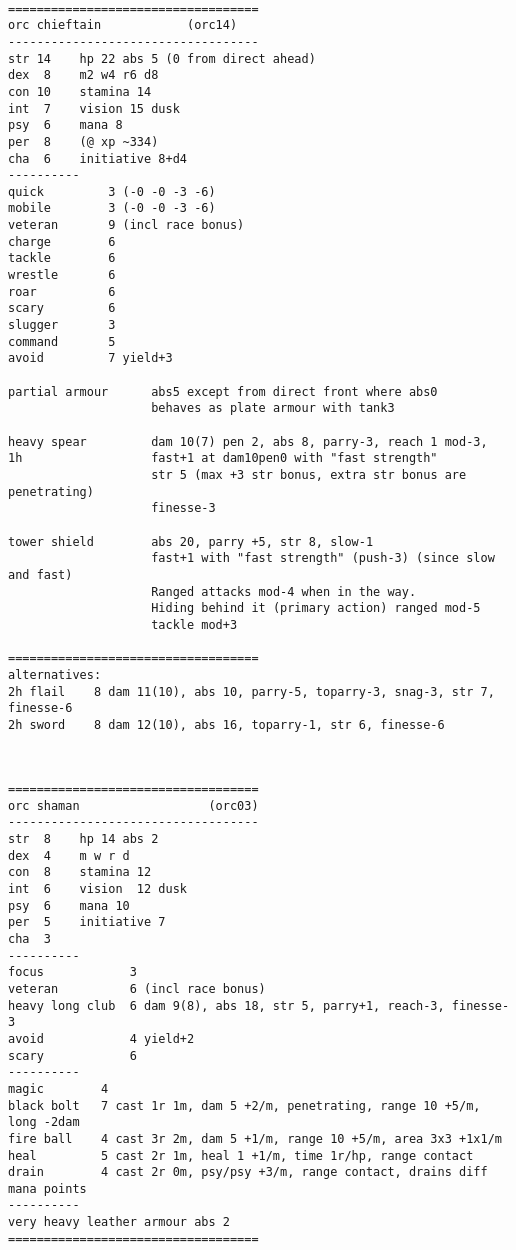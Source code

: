 \

\goodbreak \begin{samepage} \small \begin{verbatim}
===================================
orc chieftain            (orc14)
-----------------------------------
str 14    hp 22 abs 5 (0 from direct ahead)
dex  8    m2 w4 r6 d8
con 10    stamina 14
int  7    vision 15 dusk
psy  6    mana 8
per  8    (@ xp ~334)
cha  6    initiative 8+d4
----------
quick         3 (-0 -0 -3 -6)
mobile        3 (-0 -0 -3 -6)
veteran       9 (incl race bonus)
charge        6
tackle        6
wrestle       6
roar          6
scary         6
slugger       3
command       5
avoid         7 yield+3

partial armour      abs5 except from direct front where abs0
                    behaves as plate armour with tank3

heavy spear         dam 10(7) pen 2, abs 8, parry-3, reach 1 mod-3,
1h                  fast+1 at dam10pen0 with "fast strength"
                    str 5 (max +3 str bonus, extra str bonus are penetrating)
                    finesse-3

tower shield        abs 20, parry +5, str 8, slow-1
                    fast+1 with "fast strength" (push-3) (since slow and fast)
                    Ranged attacks mod-4 when in the way.
                    Hiding behind it (primary action) ranged mod-5
                    tackle mod+3

===================================
alternatives:
2h flail    8 dam 11(10), abs 10, parry-5, toparry-3, snag-3, str 7, finesse-6
2h sword    8 dam 12(10), abs 16, toparry-1, str 6, finesse-6
\end{verbatim} \normalsize \end{samepage}

\

\goodbreak \begin{samepage} \small \begin{verbatim}
===================================
orc shaman                  (orc03)
-----------------------------------
str  8    hp 14 abs 2
dex  4    m w r d
con  8    stamina 12
int  6    vision  12 dusk
psy  6    mana 10
per  5    initiative 7
cha  3
----------
focus            3
veteran          6 (incl race bonus)
heavy long club  6 dam 9(8), abs 18, str 5, parry+1, reach-3, finesse-3
avoid            4 yield+2
scary            6
----------
magic        4
black bolt   7 cast 1r 1m, dam 5 +2/m, penetrating, range 10 +5/m, long -2dam
fire ball    4 cast 3r 2m, dam 5 +1/m, range 10 +5/m, area 3x3 +1x1/m
heal         5 cast 2r 1m, heal 1 +1/m, time 1r/hp, range contact
drain        4 cast 2r 0m, psy/psy +3/m, range contact, drains diff mana points
----------
very heavy leather armour abs 2
===================================
\end{verbatim} \normalsize \end{samepage}

